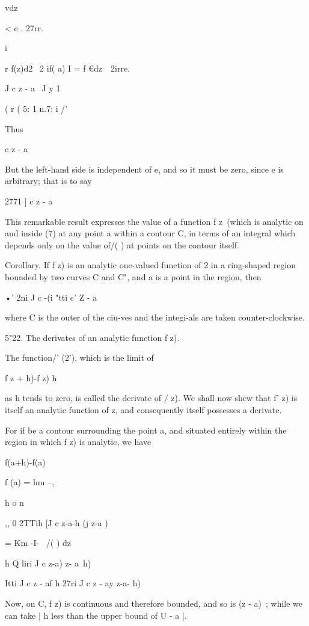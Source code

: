{{vdz

< e . 27rr.

i

%
%

r f(z)d2 \ 2 if( a) I = f €dz\ \ 2irre.

J c z - a \ J y 1

( r ( 5: 1 n.7: i /'

Thus

c z - a

But the left-hand side is independent of e, and so it must be zero,
since e is arbitrary; that is to say

    2771 ] c z - a

This remarkable result expresses the value of a function f z\ (which
is analytic on and inside (7) at any point a within a contour C, in
terms of an integral which depends only on the value of/( ) at points
on the contour itself.

Corollary. If f z) is an analytic one-valued function of 2 in a
ring-shaped region bounded by two curves C and C", and a is a point in
the region, then

•' 2ni J c -(i "tti c' Z - a

where C is the outer of the ciu-ves and the integi-als are taken
counter-clockwise.

5"22. The derivates of an analytic function f z).

The function/' (2'), which is the limit of

f z + h)-f z) h

as h tends to zero, is called the derivate of / z). We shall now shew
that f' z) is itself an analytic function of z, and consequently
itself possesses a derivate.

For if be a contour surrounding the point a, and situated entirely
within the region in which f z) is analytic, we have

f(a+h)-f(a)

f (a) = hm --,

h o n

,, 0 2TTih [J c z-a-h (j z-a )

= Km -I- \ /( ) dz

h Q liri J c z-a) z- a~h)

Itti J c z - af h 27ri J c z - ay z-a- h)

Now, on C, f z) is continuous and therefore bounded, and so is (z -
a)~; while we can take | h less than the upper bound of U - a |.

\

}}
